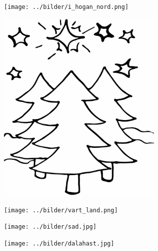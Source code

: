 %

\begin{intersong}
\sffamily\bfseries\LARGE{}
\begin{center}
\texttt{[image: ../bilder/i\_hogan\_nord.png]} 
\end{center}
\end{intersong}
\sclearpage
\begin{intersong}
	\begin{center}
		\includegraphics[width=8cm]{../bilder/fardigabilder/BilderTillKapitel/julstjarna.png} 
	\end{center}
\end{intersong}

\begin{intersong}
\begin{center}
\texttt{[image: ../bilder/vart\_land.png]} 
\end{center}
\end{intersong}
\sclearpage

\sclearpage

\sclearpage

\sclearpage

\begin{intersong}
\begin{center}
\texttt{[image: ../bilder/sad.jpg]} 
\end{center}
\end{intersong}
\sclearpage

\sclearpage

\sclearpage

\sclearpage

\sclearpage

\sclearpage

\sclearpage

\sclearpage

\sclearpage

\begin{intersong}
\begin{center}
\texttt{[image: ../bilder/dalahast.jpg]} 
\end{center}
\end{intersong}
\sclearpage

\sclearpage

\sclearpage

